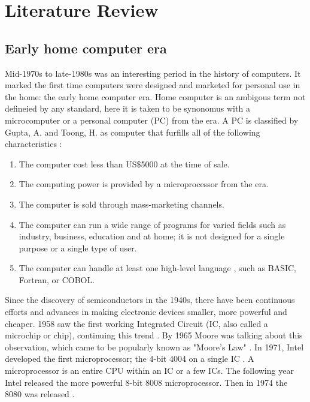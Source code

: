 

\chapter{Literature Review} %
\label{Chapter2} %

\section{Early home computer era}
 
Mid-1970s to late-1980s was an interesting period in the history of computers. It marked the first time computers were designed and marketed for personal use in the home: the early home computer era. Home computer is an ambigous term not defineied by any standard, here it is taken to be synonomus with a microcomputer or a personal computer (PC) from the era.  A PC is classified by Gupta, A. and Toong, H.  as computer that furfills all of the following characteristics \cite{Gupta84}: \\

\begin{enumerate}
\item The computer cost less than US\$5000 at the time of sale.\\
\item The computing power is provided by a microprocessor from the era. \\
\item The computer is sold through mass-marketing channels. \\
\item The computer can run a wide range of programs for varied fields such as industry, business, education and at home; it is not designed for a single purpose or a single type of user.
\item The computer can handle at least one high-level language , such as BASIC, Fortran, or COBOL.
\end{enumerate}

Since the discovery of semiconductors in the 1940s, there have been continuous efforts and advances in making electronic devices smaller, more powerful and cheaper. 1958 saw the first working Integrated Circuit (IC, also called a microchip or chip), continuing this trend \cite{Kilby01}. By 1965 Moore was talking about this observation, which came to be popularly known as "Moore's Law" \cite{moore65}. In 1971, Intel developed the first microprocessor; the 4-bit 4004 on a single IC \cite{intel4004}. A microprocessor is an entire CPU within an IC or a few ICs. The following year Intel released the more powerful 8-bit 8008 microprocessor. Then in 1974 the 8080 was released \cite{intelchips}. \\

